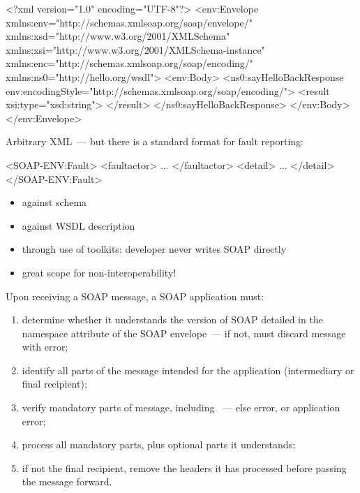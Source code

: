\documentclass{sepslide-soa-faked} %
\begin{document}
\begin{slide}
\begin{xml}
<?xml version="1.0" encoding="UTF-8"?>
<env:Envelope 
  xmlns:env="http://schemas.xmlsoap.org/soap/envelope/"
  xmlns:xsd="http://www.w3.org/2001/XMLSchema"
  xmlns:xsi="http://www.w3.org/2001/XMLSchema-instance"
  xmlns:enc="http://schemas.xmlsoap.org/soap/encoding/" 
  xmlns:ns0="http://hello.org/wsdl">
  <env:Body>
    <ns0:sayHelloBackResponse 
      env:encodingStyle="http://schemas.xmlsoap.org/soap/encoding/">
      <result xsi:type="xsd:string">
      </result>
    </ns0:sayHelloBackResponse>
  </env:Body>
</env:Envelope>
\end{xml}
\end{slide}

\begin{slide}

Arbitrary XML~---
but there is a standard format for fault reporting:
\begin{xml}
<SOAP-ENV:Fault>
  <faultactor> ... </faultactor>
  <detail> ... </detail>
</SOAP-ENV:Fault>
\end{xml}
\end{slide}

\begin{slide}
\begin{itemize}
\item against schema
\item against WSDL description
\item through use of toolkits: developer never writes SOAP directly
\item great scope for non-interoperability!
\end{itemize}
\end{slide}

\begin{slide}
Upon receiving a SOAP message, a SOAP application must:
\begin{enumerate}
	\item determine whether it understands the version of SOAP
		detailed in the namespace attribute of the SOAP
		envelope~---  if not, must discard message with
		 error;
	\item identify all parts of the message intended for the application
		(intermediary or final recipient);
	\item verify mandatory parts of message, including
  	    ~--- else 
  	    error, or application error;
	\item process all mandatory parts, plus optional parts it
		understands;
	\item if not the final recipient, remove the headers it
		has processed before passing the message forward.
\end{enumerate}
\end{slide}
\end{document}
